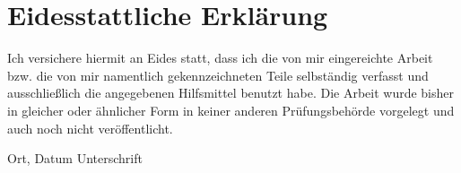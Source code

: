 \chapter*{Eidesstattliche Erklärung}

Ich versichere hiermit an Eides statt, dass ich die von mir eingereichte Arbeit bzw. die von mir namentlich gekennzeichneten Teile selbständig verfasst und ausschließlich die angegebenen Hilfsmittel benutzt habe. Die Arbeit wurde bisher in gleicher oder ähnlicher Form in keiner anderen Prüfungsbehörde vorgelegt und auch noch nicht veröffentlicht.

\vspace{4cm}

\hspace{2cm} Ort, Datum \hfill Unterschrift \hspace{2cm}
